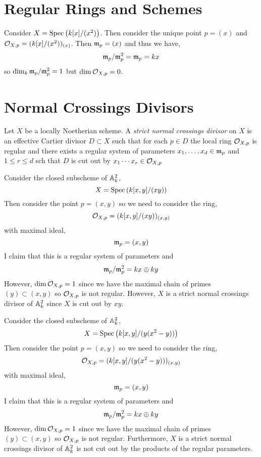 \documentclass[12pt]{article}
\begin{document}
\section{Regular Rings and Schemes}

\begin{example}
Consider $X = \mathrm{Spec}\left( k[x]/(x^2) \right)$. Then consider the unique point $p = (x)$ and $\mathcal{O}_{X, p} = (k[x]/(x^2))_{(x)}$. Then $\mathfrak{m}_p = (x)$ and thus we have,
\[ \mathfrak{m}_p / \mathfrak{m}_p^2 = \mathfrak{m}_p = k x \]
so $\dim_k \mathfrak{m}_p / \mathfrak{m}_p^2 = 1$ but $\dim{\mathcal{O}_{X, p}} = 0$. 
\end{example}

\section{Normal Crossings Divisors}

\begin{definition}
Let $X$ be a locally Noetherian scheme. A \textit{strict normal crossings divisor} on $X$ is an effective Cartier divisor $D \subset X$ such that for each $p \in D$ the local ring $\mathcal{O}_{X, p}$ is regular and there exists a regular system of parameters $x_1, \dots, x_d \in \mathfrak{m}_p$ and $1 \le r \le d$ sch that $D$ is cut out by $x_1 \cdots x_r \in \mathcal{O}_{X, p}$ 
\end{definition}

\begin{example}
Consider the closed subscheme of $\mathbb{A}^2_k$,
\[ X = \mathrm{Spec}\left( k[x, y]/(xy) \right) \]
Then consider the point $p = (x, y)$ so we need to consider the ring,
\[ \mathcal{O}_{X, p} = (k[x, y]/(xy))_{(x, y)} \]
with maximal ideal,
\[ \mathfrak{m}_p = (x, y) \]
I claim that this is a regular system of parameters and
\[ \mathfrak{m}_p / \mathfrak{m}_p^2 = k x \oplus k y \] 
However, $\dim{\mathcal{O}_{X, p}} = 1$ since we have the maximal chain of primes $(y) \subset (x, y)$ so $\mathcal{O}_{X, p}$ is not regular. However, $X$ is a strict normal crossings divisor of $\mathbb{A}^2_k$ since $X$ is cut out by $xy$. 
\end{example}

\begin{example}
Consider the closed subscheme of $\mathbb{A}^2_k$,
\[ X = \mathrm{Spec}\left( k[x, y]/(y(x^2 - y)) \right) \]
Then consider the point $p = (x, y)$ so we need to consider the ring,
\[ \mathcal{O}_{X, p} = (k[x, y]/(y(x^2 - y)))_{(x, y)} \]
with maximal ideal,
\[ \mathfrak{m}_p = (x, y) \]
I claim that this is a regular system of parameters and
\[ \mathfrak{m}_p / \mathfrak{m}_p^2 = k x \oplus k y \] 
However, $\dim{\mathcal{O}_{X, p}} = 1$ since we have the maximal chain of primes $(y) \subset (x, y)$ so $\mathcal{O}_{X, p}$ is not regular. Furthermore, $X$ is a strict normal crossings divisor of $\mathbb{A}^2_k$ is not cut out by the products of the regular parameters. 
\end{example}
\end{document}

